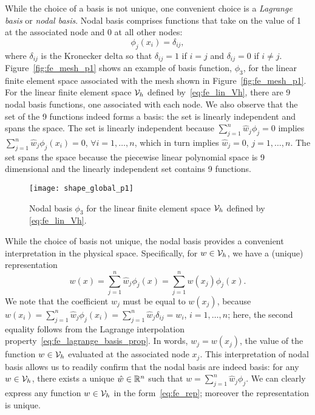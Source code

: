 While the choice of a basis is not unique, one convenient choice is a \emph{Lagrange basis} or \emph{nodal basis}.  Nodal basis comprises functions that take on the value of 1 at the associated node and 0 at all other nodes:
\begin{equation}
  \phi_j(x_i) = \delta_{ij},
  \label{eq:fe_lagrange_basis_prop}
\end{equation}
where $\delta_{ij}$ is the Kronecker delta so that $\delta_{ij} = 1$ if $i = j$ and $\delta_{ij} = 0$ if $i \neq j$. Figure~\ref{fig:fe_mesh_p1} shows an example of basis function, $\phi_3$, for the linear finite element space associated with the mesh shown in Figure~\ref{fig:fe_mesh_p1}.  For the linear finite element space $\mathcal{V}_h$ defined by~\eqref{eq:fe_lin_Vh}, there are 9 nodal basis functions, one associated with each node.  We also observe that the set of the 9 functions indeed forms a basis: the set is linearly independent and spans the space. The set is linearly independent because $\sum_{j=1}^n \hat w_j \phi_j = 0$ implies $\sum_{j=1}^n \hat w_j \phi_j(x_i) = 0$, $\forall i =1,\dots,n$, which in turn implies $\hat w_j = 0$, $j = 1,\dots,n$.  The set spans the space because the piecewise linear polynomial space is 9 dimensional and the linearly independent set contains 9 functions.

\begin{figure}
  \centering
  \texttt{[image: shape\_global\_p1]}
  \caption{Nodal basis $\phi_3$ for the linear finite element space $\mathcal{V}_h$ defined by \eqref{eq:fe_lin_Vh}.}
  \label{fig:fe_shape_global_p1}
\end{figure}

While the choice of basis not unique, the nodal basis provides a convenient interpretation in the physical space.  Specifically, for $w \in \mathcal{V}_h$, we have a (unique) representation
\begin{equation}
  w(x) = \sum_{j=1}^n \hat w_j \phi_j(x) = \sum_{j=1}^n w(x_j) \phi_j(x).
  \label{eq:fe_rep}
\end{equation}
We note that the coefficient $w_j$ must be equal to $w(x_j)$, because $w(x_i) = \sum_{j=1}^n \hat w_j \phi_j(x_i) = \sum_{j=1}^n \hat w_j \delta_{ij} = w_i$, $i = 1,\dots,n$; here, the second equality follows from the Lagrange interpolation property~\eqref{eq:fe_lagrange_basis_prop}.  In words, $w_j = w(x_j)$, the value of the function $w \in \mathcal{V}_h$ evaluated at the associated node $x_j$. This interpretation of nodal basis allows us to readily confirm that the nodal basis are indeed basis: for any $w \in \mathcal{V}_h$, there exists a unique $\hat w \in \mathbb{R}^n$ such that $w = \sum_{j=1}^n \hat w_j \phi_j$.  We can clearly express any function $w \in \mathcal{V}_h$ in the form~\eqref{eq:fe_rep}; moreover the representation is unique. 

